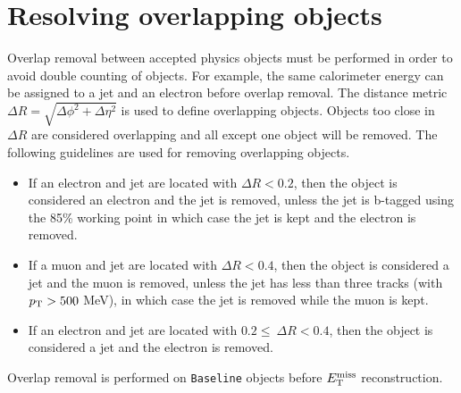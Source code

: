 \section{Resolving overlapping objects}
\label{sec:Selection_overlap}

\indent Overlap removal between accepted physics objects must be performed in order to avoid double counting of objects. For example, the same calorimeter energy can be assigned to a jet and an electron before overlap removal.  The distance metric  $\Delta R = \sqrt{\Delta \phi^2 + \Delta \eta^2}$ is used to define overlapping objects.  Objects too close in $\Delta R$ are considered overlapping and all except one object will be removed.  The following guidelines are used for removing overlapping objects. \\

\begin{itemize}
\item If an electron and jet are located with $\Delta R < 0.2$, then the object is considered an electron and the jet is removed, unless the jet is b-tagged using the 85\% working point in which case the jet is kept and the electron is removed. 
\item If a muon and jet are located with $\Delta R < 0.4$, then the object is considered a jet and the muon is removed, unless the jet has less than three tracks (with $p_{\mathrm{T}}>500$ MeV), in which case the jet is removed while the muon is kept. 
\item If an electron and jet are located with $0.2 \leq\ \Delta R < 0.4$, then the object is considered a jet and the electron is removed.
\end{itemize}

\indent Overlap removal is performed on {\tt Baseline} objects before $E_{\mathrm{T}}^{\mathrm{miss}}$ reconstruction. \\


